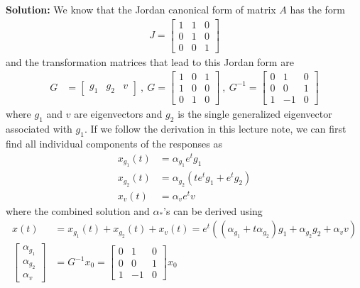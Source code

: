 \documentclass[twoside]{article}
\begin{document}
\textbf{Solution:} We know that the Jordan canonical form of matrix $A$ has the form
%
\begin{align*}
  J = \begin{bmatrix} 1 & 1 & 0 \\ 0 & 1 & 0 \\ 0 & 0 & 1 \end{bmatrix} 
\end{align*}
% 
and the transformation matrices that lead to this Jordan form are
%
\begin{align*}
 G &= \begin{bmatrix} g_1 & g_2 & v \end{bmatrix}
 \ , \ 
 G = \begin{bmatrix} 1 & 0 & 1 \\ 1 & 0 & 0 \\ 0 & 1 & 0 \end{bmatrix}
 \  , \ 
 G^{-1} = \begin{bmatrix} 0 & 1 & 0 \\ 0 & 0 & 1 \\ 1 & -1 & 0 \end{bmatrix}
\end{align*}
%
where $g_1$ and $v$ are eigenvectors and $g_2$ is the single generalized eigenvector associated with $g_1$.
If we follow the derivation in this lecture note, we can first find all individual components of the responses as
%
\begin{align*}
 x_{g_1}(t) &= \alpha_{g_1} e^{t} g_1  
 \\[1ex]
 x_{g_2}(t) &= \alpha_{g_2} \left( t e^{t} g_1  + e^{t} g_2 \right)
 \\[1ex]
 x_{v}(t) &= \alpha_{v} e^{t} v  
\end{align*}
%
where the combined solution and $\alpha_{*}$'s can be derived using
%
\begin{align*}
x(t) &=  x_{g_1}(t) +  x_{g_2}(t) +  x_{v}(t)  = e^{t} \left( (\alpha_{g_1} + t \alpha_{g_2})g_1 + \alpha_{g_2}  g_2 + \alpha_{v} v  \right) 
\\[1ex]
\begin{bmatrix} \alpha_{g_1} \\ \alpha_{g_2} \\ \alpha_{v} \end{bmatrix} &= G^{-1} x_0 = \begin{bmatrix} 0 & 1 & 0 \\ 0 & 0 & 1 \\ 1 & -1 & 0 \end{bmatrix} x_0
\end{align*}
\end{document}

